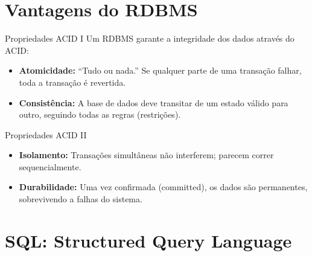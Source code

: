 \documentclass[
  ignorenonframetext,
]{beamer}
\providecommand{\tightlist}{%
  \setlength{\itemsep}{0pt}\setlength{\parskip}{0pt}}
\begin{document}
\section{Vantagens do RDBMS}\label{vantagens-do-rdbms}

\begin{frame}{Propriedades ACID I}
\protect{}\label{propriedades-acid-i}
Um RDBMS garante a integridade dos dados através do ACID:

\begin{itemize}
\tightlist
\item
  \textbf{Atomicidade:} ``Tudo ou nada.'' Se qualquer parte de uma
  transação falhar, toda a transação é revertida.
\item
  \textbf{Consistência:} A base de dados deve transitar de um estado
  válido para outro, seguindo todas as regras (restrições).
\end{itemize}
\end{frame}

\begin{frame}{Propriedades ACID II}
\protect{}\label{propriedades-acid-ii}
\begin{itemize}
\tightlist
\item
  \textbf{Isolamento:} Transações simultâneas não interferem; parecem
  correr sequencialmente.
\item
  \textbf{Durabilidade:} Uma vez confirmada (committed), os dados são
  permanentes, sobrevivendo a falhas do sistema.
\end{itemize}
\end{frame}

\section{SQL: Structured Query
Language}\label{sql-structured-query-language}
\end{document}

